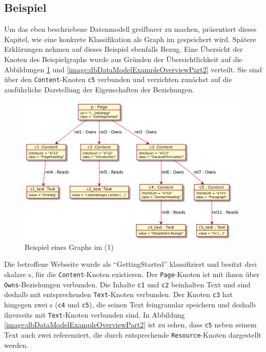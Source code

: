 \subsection{Beispiel}
    \label{section:solutionDetailPersistenceDataModelExample}
    Um das eben beschriebene Datenmodell greifbarer zu machen,
    präsentiert dieses Kapitel, wie eine konkrete Klassifikation als
    Graph im {\classificationStorage} gespeichert wird.
    Spätere Erklärungen nehmen auf dieses Beispiel ebenfalls Bezug.
    Eine Übersicht der Knoten des Beispielgraphs wurde aus Gründen
    der Übersichtlichkeit auf die Abbildungen \ref{image:dbDataModelExampleOverviewPart1}
    und \ref{image:dbDataModelExampleOverviewPart2} verteilt.
    Sie sind über den \texttt{Content}-Knoten \texttt{c5} verbunden
    und verzichten zunächst auf die ausführliche Darstellung der Eigenschaften der Beziehungen.

    \begin{figure}[htb]
        \centering
        \includegraphics[scale=\imageScalingFactor]{../resources/db-data-model/example/example_part1.png}
        \caption{Beispiel eines Graphs im {\classificationStorage} (1)}
        \label{image:dbDataModelExampleOverviewPart1}
    \end{figure}

    Die betroffene Webseite wurde als "`GettingStarted"' klassifiziert und besitzt drei skalare {\contentFeature}s,
    für die \texttt{Content}-Knoten existieren.
    Der \texttt{Page}-Knoten ist mit ihnen über \texttt{Owns}-Beziehungen verbunden.
    Die Inhalte \texttt{c1} und \texttt{c2} beinhalten Text und sind deshalb mit entsprechenden \texttt{Text}-Knoten verbunden.
    Der Knoten \texttt{c3} hat hingegen zwei {\childFeature}s (\texttt{c4} und \texttt{c5}), die seinen Text feingranular speichern
    und deshalb ihrerseits mit \texttt{Text}-Knoten verbunden sind.
    In Abbildung \ref{image:dbDataModelExampleOverviewPart2} ist zu sehen,
    dass \texttt{c5} neben seinem Text auch zwei {\resources} referenziert,
    die durch entsprechende \texttt{Resource}-Knoten dargestellt werden.

